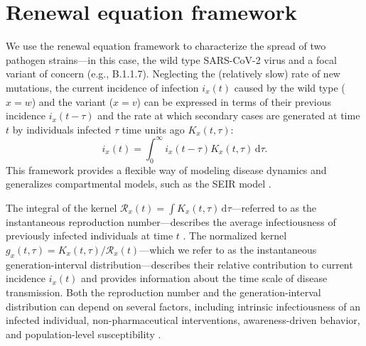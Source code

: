 \documentclass[12pt]{article}
\newcommand{\RR}{\ensuremath{{\mathcal R}}\xspace}
\newcommand{\dd}[1]{\ensuremath{\, \mathrm{d}#1}}
\newcommand{\dtau}{\dd{\tau}}
\begin{document}
\section{Renewal equation framework}

We use the renewal equation framework to characterize the spread of two pathogen strains---in this case, the wild type SARS-CoV-2 virus and a focal variant of concern (e.g., B.1.1.7).
Neglecting the (relatively slow) rate of new mutations, the current incidence of infection $i_x(t)$ caused by the wild type ($x=w$) and the variant ($x=v$) can be expressed in terms of their previous incidence $i_x(t-\tau)$ and the rate at which secondary cases are generated at time $t$ by individuals infected $\tau$ time units ago $K_x(t, \tau)$:
\begin{equation}
i_x(t) = \int_0^\infty i_x(t-\tau) K_x(t, \tau) \dtau.
\end{equation}
This framework provides a flexible way of modeling disease dynamics and generalizes compartmental models, such as the SEIR model \citep{heesterbeek1996concept, diekmann2000mathematical, roberts2004modelling, aldis2005integral, roberts2007model, champredon2018equivalence}.

The integral of the kernel $\RR_x(t) = \int K_x(t, \tau) \dtau$---referred to as the instantaneous reproduction number---describes the average infectiousness of previously infected individuals at time $t$ \citep{fraser2007estimating}.
The normalized kernel $g_x(t, \tau) = K_x(t, \tau)/\RR_x(t)$---which we refer to as the instantaneous generation-interval distribution---describes their relative contribution to current incidence $i_x(t)$ and provides information about the time scale of disease transmission.
Both the reproduction number and the generation-interval distribution can depend on several factors, including intrinsic infectiousness of an infected individual, non-pharmaceutical interventions, awareness-driven behavior, and population-level susceptibility \citep{fraser2007estimating}.
\end{document}
